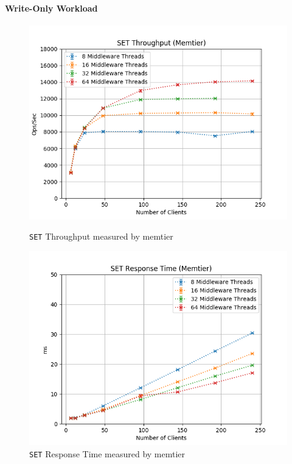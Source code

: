 \documentclass[11pt,a4paper]{article}
\begin{document}
\paragraph{Write-Only Workload}
%
\begin{figure}[H]
	\centering
    \begin{minipage}{0.5\textwidth}
        \centering
        \includegraphics[width=\textwidth]{../illustrations/plots/2_1_one_middleware/1-0/memtier_set_tp_s.png}
        \caption{\texttt{SET} Throughput measured by memtier}
        \label{fig:one_middleware_set_tp_mt}
    \end{minipage}\hfill
    \begin{minipage}{0.5\textwidth}
        \centering
        \includegraphics[width=\textwidth]{../illustrations/plots/2_1_one_middleware/1-0/memtier_set_rt_ms.png}
        \caption{\texttt{SET} Response Time measured by memtier}
        \label{fig:one_middleware_set_rt_mt}
    \end{minipage}
\end{figure}
\end{document}
